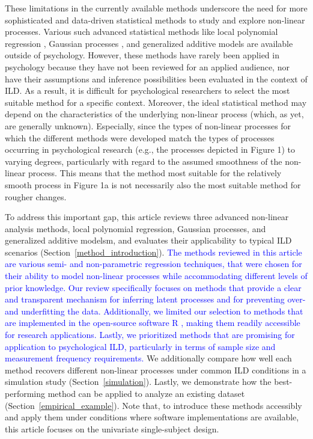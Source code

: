 \documentclass[man, floatsintext]{apa7}
\begin{document}
These limitations in the currently available methods underscore the need for
more sophisticated and data-driven statistical methods to study and explore
non-linear processes. Various such advanced statistical methods like local
polynomial regression \parencite{fan_local_2018}, Gaussian processes
\parencite{rasmussen_gaussian_2006}, and generalized additive models
\parencite{wood_generalized_2006} are available outside of psychology. However,
these methods have rarely been applied in psychology because they have not been
reviewed for an applied audience, nor have their assumptions and inference
possibilities been evaluated in the context of ILD\@. As a result, it is
difficult for psychological researchers to select the most suitable method for
a specific context. Moreover, the ideal statistical method may depend on the
characteristics of the underlying non-linear process (which, as yet,  are
generally unknown). Especially, since the types of non-linear processes for
which the different methods were developed match the types of processes
occurring in psychological research (e.g., the processes depicted in Figure 1)
to varying degrees, particularly with regard to the assumed smoothness of the
non-linear process. This means that the method most suitable for the relatively
smooth process in Figure 1a is not necessarily also the most suitable method
for rougher changes.

To address this important gap, this article reviews three advanced non-linear
analysis methods, local polynomial regression, Gaussian processes, and
generalized additive modelsm, and evaluates their applicability to typical ILD
scenarios (Section~\ref{method_introduction}). \textcolor{blue}{ The methods
  reviewed in this article are various semi- and non-parametric regression
  techniques, that were chosen for their ability to model non-linear processes
  while accommodating different levels of prior knowledge. Our review
  specifically focuses on methods that provide a clear and transparent
  mechanism
  for inferring latent processes and for preventing over- and underfitting the
  data. Additionally, we limited our selection to methods that are implemented
  in
  the open-source software R \parencite{R-base}, making them readily accessible
  for research applications. Lastly, we prioritized methods that are promising
  for application to psychological ILD, particularly in terms of sample size
  and
  measurement frequency requirements.} We additionally compare how well each
method recovers different non-linear processes under common ILD conditions in a
simulation study (Section~\ref{simulation}). Lastly, we demonstrate how the
best-performing method can be applied to analyze an existing dataset
(Section~\ref{empirical_example}). Note that, to introduce these methods
accessibly and apply them under conditions where software implementations are
available, this article focuses on the univariate single-subject design.
\end{document}
